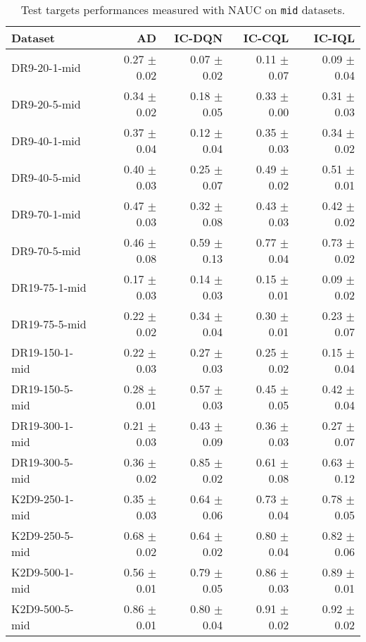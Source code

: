 \begin{table}[ht]
    \label{tab:}
    \begin{center}
    \caption{Test targets performances measured with NAUC on \texttt{mid} datasets.}
    \begin{small}
    \begin{adjustbox}{max width=\columnwidth}
		\begin{tabular}{l|rrrr}
		\toprule
	\textbf{Dataset} & \textbf{AD} & \textbf{IC-DQN} & \textbf{IC-CQL} & \textbf{IC-IQL}\\
\midrule
DR9-20-1-mid & 0.27 $\pm$ 0.02 & 0.07 $\pm$ 0.02 & 0.11 $\pm$ 0.07 & 0.09 $\pm$ 0.04\\
DR9-20-5-mid & 0.34 $\pm$ 0.02 & 0.18 $\pm$ 0.05 & 0.33 $\pm$ 0.00 & 0.31 $\pm$ 0.03\\
DR9-40-1-mid & 0.37 $\pm$ 0.04 & 0.12 $\pm$ 0.04 & 0.35 $\pm$ 0.03 & 0.34 $\pm$ 0.02\\
DR9-40-5-mid & 0.40 $\pm$ 0.03 & 0.25 $\pm$ 0.07 & 0.49 $\pm$ 0.02 & 0.51 $\pm$ 0.01\\
DR9-70-1-mid & 0.47 $\pm$ 0.03 & 0.32 $\pm$ 0.08 & 0.43 $\pm$ 0.03 & 0.42 $\pm$ 0.02\\
DR9-70-5-mid & 0.46 $\pm$ 0.08 & 0.59 $\pm$ 0.13 & 0.77 $\pm$ 0.04 & 0.73 $\pm$ 0.02\\
DR19-75-1-mid & 0.17 $\pm$ 0.03 & 0.14 $\pm$ 0.03 & 0.15 $\pm$ 0.01 & 0.09 $\pm$ 0.02\\
DR19-75-5-mid & 0.22 $\pm$ 0.02 & 0.34 $\pm$ 0.04 & 0.30 $\pm$ 0.01 & 0.23 $\pm$ 0.07\\
DR19-150-1-mid & 0.22 $\pm$ 0.03 & 0.27 $\pm$ 0.03 & 0.25 $\pm$ 0.02 & 0.15 $\pm$ 0.04\\
DR19-150-5-mid & 0.28 $\pm$ 0.01 & 0.57 $\pm$ 0.03 & 0.45 $\pm$ 0.05 & 0.42 $\pm$ 0.04\\
DR19-300-1-mid & 0.21 $\pm$ 0.03 & 0.43 $\pm$ 0.09 & 0.36 $\pm$ 0.03 & 0.27 $\pm$ 0.07\\
DR19-300-5-mid & 0.36 $\pm$ 0.02 & 0.85 $\pm$ 0.02 & 0.61 $\pm$ 0.08 & 0.63 $\pm$ 0.12\\
K2D9-250-1-mid & 0.35 $\pm$ 0.03 & 0.64 $\pm$ 0.06 & 0.73 $\pm$ 0.04 & 0.78 $\pm$ 0.05\\
K2D9-250-5-mid & 0.68 $\pm$ 0.02 & 0.64 $\pm$ 0.02 & 0.80 $\pm$ 0.04 & 0.82 $\pm$ 0.06\\
K2D9-500-1-mid & 0.56 $\pm$ 0.01 & 0.79 $\pm$ 0.05 & 0.86 $\pm$ 0.03 & 0.89 $\pm$ 0.01\\
K2D9-500-5-mid & 0.86 $\pm$ 0.01 & 0.80 $\pm$ 0.04 & 0.91 $\pm$ 0.02 & 0.92 $\pm$ 0.02\\

\end{tabular}
\end{adjustbox}
\end{small}
\end{center}
\end{table}
